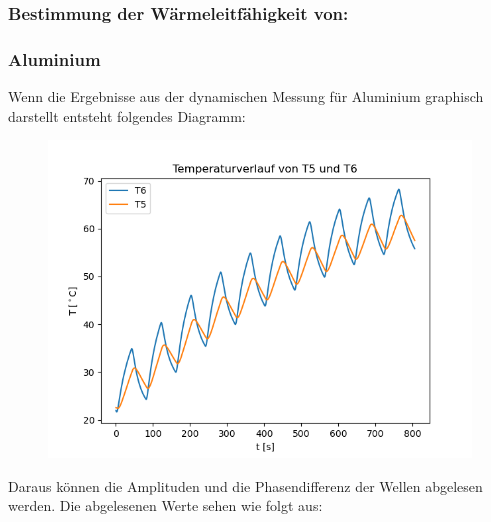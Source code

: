 \subsubsection{Bestimmung der Wärmeleitfähigkeit von:}

\subsubsection{Aluminium}

Wenn die Ergebnisse aus der dynamischen Messung für Aluminium graphisch darstellt entsteht folgendes Diagramm:

\begin{figure}[H]
    \centering
    \includegraphics{alu.png}
\end{figure}

Daraus können die Amplituden und die Phasendifferenz der Wellen abgelesen werden. Die abgelesenen Werte sehen wie folgt aus:

